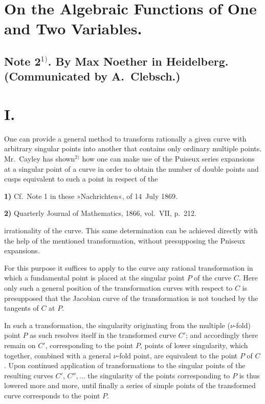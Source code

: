 \documentclass{article}
\begin{document}

\section*{On the Algebraic Functions of One and Two Variables.}

\subsection*{Note 2${}^{1)}$. By Max Noether in Heidelberg. (Communicated by A.~Clebsch.)}

\section*{I.}

One can provide a general method to transform rationally a given curve with arbitrary singular points into another that contains only ordinary multiple points. Mr.~Cayley has shown${}^{2)}$ how one can make use of the Puiseux series expansions at a singular point of a curve in order to obtain the number of double points and cusps equivalent to such a point in respect of the

\textbf{1)} Cf.\ Note 1 in these »Nachrichten«, of 14~July 1869.

\textbf{2)} Quarterly Journal of Mathematics, 1866, vol.\ VII, p.\ 212.

irrationality of the curve. This same determination can be achieved directly with the help of the mentioned transformation, without presupposing the Pniseux expansions.

For this purpose it suffices to apply to the curve any rational transformation in which a fundamental point is placed at the singular point $P$ of the curve $C$. Here only such a general position of the transformation curves with respect to $C$ is presupposed that the Jacobian curve of the transformation is not touched by the tangents of $C$ at $P$.

In such a transformation, the singularity originating from the multiple ($\nu$-fold) point $P$ as such resolves itself in the transformed curve $C'$; and accordingly there remain on $C'$, corresponding to the point $P$, points of lower singularity, which together, combined with a general $\nu$-fold point, are equivalent to the point $P$ of $C$. Upon continued application of transformations to the singular points of the resulting curves $C'$, $C'', \ldots$ the singularity of the points corresponding to $P$ is thus lowered more and more, until finally a series of simple points of the transformed curve corresponds to the point $P$.
\end{document}
